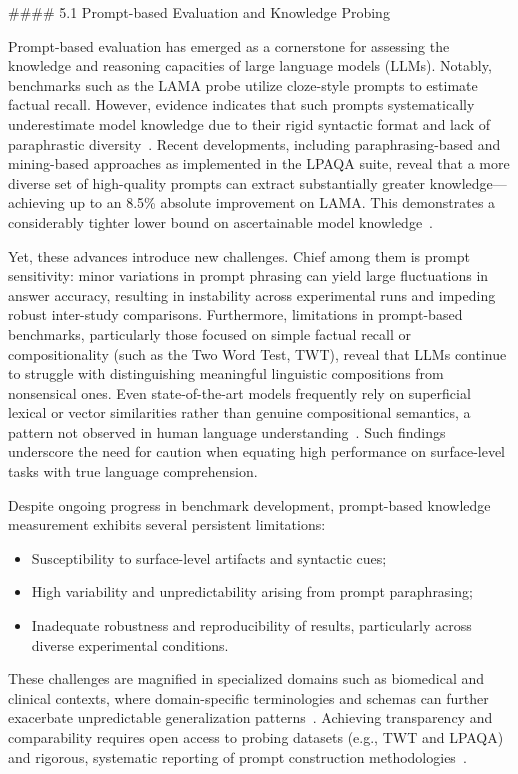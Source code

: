 \documentclass[11pt]{article}
\begin{document}
#### 5.1 Prompt-based Evaluation and Knowledge Probing

Prompt-based evaluation has emerged as a cornerstone for assessing the knowledge and reasoning capacities of large language models (LLMs). Notably, benchmarks such as the LAMA probe utilize cloze-style prompts to estimate factual recall. However, evidence indicates that such prompts systematically underestimate model knowledge due to their rigid syntactic format and lack of paraphrastic diversity~\cite{98}. Recent developments, including paraphrasing-based and mining-based approaches as implemented in the LPAQA suite, reveal that a more diverse set of high-quality prompts can extract substantially greater knowledge—achieving up to an 8.5\% absolute improvement on LAMA. This demonstrates a considerably tighter lower bound on ascertainable model knowledge~\cite{98}.

Yet, these advances introduce new challenges. Chief among them is prompt sensitivity: minor variations in prompt phrasing can yield large fluctuations in answer accuracy, resulting in instability across experimental runs and impeding robust inter-study comparisons. Furthermore, limitations in prompt-based benchmarks, particularly those focused on simple factual recall or compositionality (such as the Two Word Test, TWT), reveal that LLMs continue to struggle with distinguishing meaningful linguistic compositions from nonsensical ones. Even state-of-the-art models frequently rely on superficial lexical or vector similarities rather than genuine compositional semantics, a pattern not observed in human language understanding~\cite{96}. Such findings underscore the need for caution when equating high performance on surface-level tasks with true language comprehension.

Despite ongoing progress in benchmark development, prompt-based knowledge measurement exhibits several persistent limitations:

\begin{itemize}
    \item Susceptibility to surface-level artifacts and syntactic cues;
    \item High variability and unpredictability arising from prompt paraphrasing;
    \item Inadequate robustness and reproducibility of results, particularly across diverse experimental conditions.
\end{itemize}

These challenges are magnified in specialized domains such as biomedical and clinical contexts, where domain-specific terminologies and schemas can further exacerbate unpredictable generalization patterns~\cite{94,95}. Achieving transparency and comparability requires open access to probing datasets (e.g., TWT and LPAQA) and rigorous, systematic reporting of prompt construction methodologies~\cite{96,98}.
\end{document}
